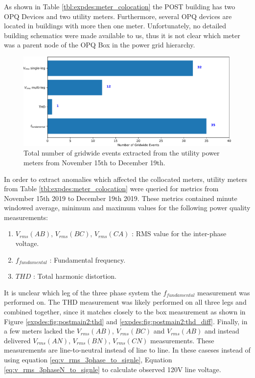 As shown in Table \ref{tbl:expdes:meter_colocation} the POST building has two OPQ Devices and two utility meters.
Furthermore, several OPQ devices are located in buildings with more then one meter.
Unfortunately, no detailed building schematics were made available to us, thus it is not clear which meter was a parent node of the OPQ Box in the power grid hierarchy.

\begin{figure}[ht!]
    \centering
    \includegraphics[width=1\linewidth]{img/napali_eval/gt/utility_events_total.pdf}
    \caption{Total number of gridwide events extracted from the utility power meters from November 15th to December 19th.}
    \label{expdes:fig:postmain2:utility_event_total}
\end{figure}

In order to extract anomalies which affected the collocated meters, utility meters from Table \ref{tbl:expdes:meter_colocation} were queried for metrics from November 15th 2019 to December 19th 2019.
These metrics contained minute windowed average, minimum and maximum values for the following power quality measurements:
\begin{enumerate}
    \item $V_{rms}(AB)$, $V_{rms}(BC)$, $V_{rms}(CA)$ : RMS value for the inter-phase voltage.
    \item $f_{fundamental}$ : Fundamental frequency.
    \item $THD$ : Total harmonic distortion.
\end{enumerate}

It is unclear which leg of the three phase system the  $f_{fundamental}$ measurement was performed on.
The THD measurement was likely performed on all three legs and combined together, since it matches closely to the box measurement as shown in Figure \ref{expdes:fig:postmain2:thd} and \ref{expdes:fig:postmain2:thd_diff}.
Finally, in a few meters lacked the $V_{rms}(AB)$, $V_{rms}(BC)$ and $V_{rms}(AB)$ and instead delivered $V_{rms}(AN)$, $V_{rms}(BN)$, $V_{rms}(CN)$ measurements.
These measurements are line-to-neutral instead of line to line.
In these caseses instead of using equation \ref{eq:v_rms_3phase_to_signle}, Equation \ref{eq:v_rms_3phaseN_to_signle} to calculate observed 120V line voltage. \cite{Horowitz:2015:AE:2960712}

